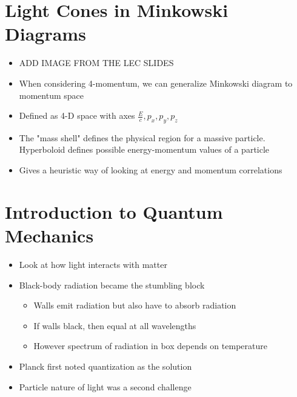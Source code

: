 \documentclass[12pt]{article}
\begin{document}
\section{Light Cones in Minkowski Diagrams}

\begin{itemize}
    \item ADD IMAGE FROM THE LEC SLIDES
    \item When considering 4-momentum, we can generalize Minkowski diagram to momentum space
    \item Defined as 4-D space with axes $\frac{E}{c}, p_x, p_y, p_z$
    \item The "mass shell" defines the physical region for a massive particle. Hyperboloid defines possible energy-momentum values of a particle
    \item Gives a heuristic way of looking at energy and momentum correlations
\end{itemize}

\section{Introduction to Quantum Mechanics}
\begin{itemize}
    \item Look at how light interacts with matter
    \item Black-body radiation became the stumbling block \begin{itemize}
        \item Walls emit radiation but also have to absorb radiation
        \item If walls black, then equal at all wavelengths
        \item However spectrum of radiation in box depends on temperature
    \end{itemize}
    \item Planck first noted quantization as the solution
    \item Particle nature of light was a second challenge
\end{itemize}
\end{document}
